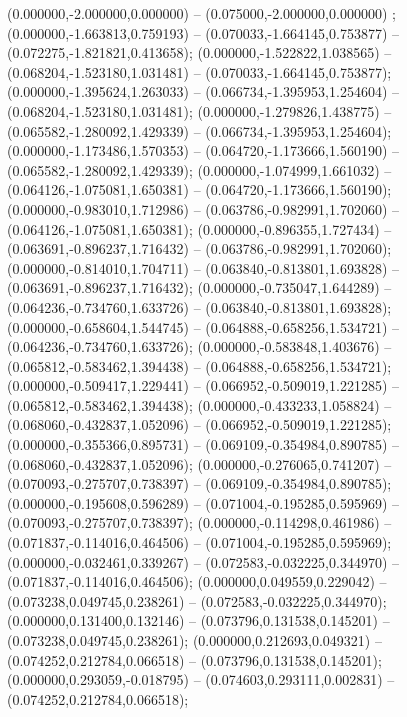  (0.000000,-2.000000,0.000000) -- (0.075000,-2.000000,0.000000) ;
 (0.000000,-1.663813,0.759193) -- (0.070033,-1.664145,0.753877) -- (0.072275,-1.821821,0.413658);
 (0.000000,-1.522822,1.038565) -- (0.068204,-1.523180,1.031481) -- (0.070033,-1.664145,0.753877);
 (0.000000,-1.395624,1.263033) -- (0.066734,-1.395953,1.254604) -- (0.068204,-1.523180,1.031481);
 (0.000000,-1.279826,1.438775) -- (0.065582,-1.280092,1.429339) -- (0.066734,-1.395953,1.254604);
 (0.000000,-1.173486,1.570353) -- (0.064720,-1.173666,1.560190) -- (0.065582,-1.280092,1.429339);
 (0.000000,-1.074999,1.661032) -- (0.064126,-1.075081,1.650381) -- (0.064720,-1.173666,1.560190);
 (0.000000,-0.983010,1.712986) -- (0.063786,-0.982991,1.702060) -- (0.064126,-1.075081,1.650381);
 (0.000000,-0.896355,1.727434) -- (0.063691,-0.896237,1.716432) -- (0.063786,-0.982991,1.702060);
 (0.000000,-0.814010,1.704711) -- (0.063840,-0.813801,1.693828) -- (0.063691,-0.896237,1.716432);
 (0.000000,-0.735047,1.644289) -- (0.064236,-0.734760,1.633726) -- (0.063840,-0.813801,1.693828);
 (0.000000,-0.658604,1.544745) -- (0.064888,-0.658256,1.534721) -- (0.064236,-0.734760,1.633726);
 (0.000000,-0.583848,1.403676) -- (0.065812,-0.583462,1.394438) -- (0.064888,-0.658256,1.534721);
 (0.000000,-0.509417,1.229441) -- (0.066952,-0.509019,1.221285) -- (0.065812,-0.583462,1.394438);
 (0.000000,-0.433233,1.058824) -- (0.068060,-0.432837,1.052096) -- (0.066952,-0.509019,1.221285);
 (0.000000,-0.355366,0.895731) -- (0.069109,-0.354984,0.890785) -- (0.068060,-0.432837,1.052096);
 (0.000000,-0.276065,0.741207) -- (0.070093,-0.275707,0.738397) -- (0.069109,-0.354984,0.890785);
 (0.000000,-0.195608,0.596289) -- (0.071004,-0.195285,0.595969) -- (0.070093,-0.275707,0.738397);
 (0.000000,-0.114298,0.461986) -- (0.071837,-0.114016,0.464506) -- (0.071004,-0.195285,0.595969);
 (0.000000,-0.032461,0.339267) -- (0.072583,-0.032225,0.344970) -- (0.071837,-0.114016,0.464506);
 (0.000000,0.049559,0.229042) -- (0.073238,0.049745,0.238261) -- (0.072583,-0.032225,0.344970);
 (0.000000,0.131400,0.132146) -- (0.073796,0.131538,0.145201) -- (0.073238,0.049745,0.238261);
 (0.000000,0.212693,0.049321) -- (0.074252,0.212784,0.066518) -- (0.073796,0.131538,0.145201);
 (0.000000,0.293059,-0.018795) -- (0.074603,0.293111,0.002831) -- (0.074252,0.212784,0.066518);
